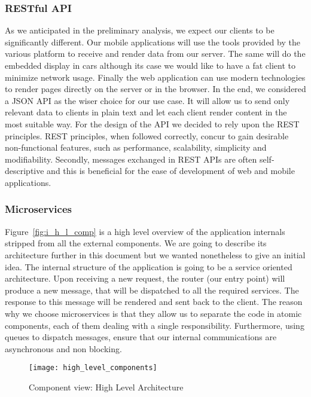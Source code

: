 \subsubsection{RESTful API}
As we anticipated in the preliminary analysis, we expect our clients to be significantly different.
Our mobile applications will use the tools provided by the various platform to receive
and render data from our server. The same will do the embedded display in cars although its
case we would like to have a fat client to minimize network usage. Finally the web application
can use modern technologies to render pages directly on the server or in the browser.
In the end, we considered a JSON API as the wiser choice for our use case. It will
allow us to send only relevant data to clients in plain text and let each client
render content in the most suitable way. 
For the design of the API we decided to rely upon the REST principles.
REST principles, when followed correctly, concur to gain desirable non-functional
features, such as performance, scalability, simplicity and modifiability.
Secondly, messages exchanged in REST APIs are often self-descriptive and this is beneficial
for the ease of development of web and mobile applications.

\subsubsection{Microservices}
Figure~\ref{fig:i_h_l_comp} is a high level overview of the application internals stripped from all
the external components. We are going to describe its architecture further in this document
but we wanted nonetheless to give an initial idea.
The internal structure of the application is going to be a service oriented architecture.
Upon receiving a new request, the router (our entry point) will produce a new message,
that will be dispatched to all the required services. The response to this message will
be rendered and sent back to the client.
The reason why we choose microservices is that they allow us to separate the code in
atomic components, each of them dealing with a single responsibility.
Furthermore, using queues to dispatch messages, ensure that our internal communications
are asynchronous and non blocking.

\begin{sidewaysfigure}
\centering
\texttt{[image: high\_level\_components]}
\caption{Component view: High Level Architecture}
\label{fig:h_l_comp}
\end{sidewaysfigure}

